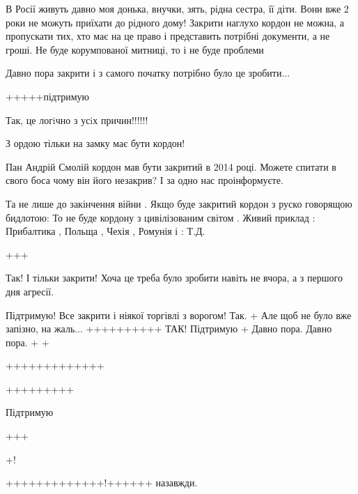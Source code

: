 В Росії живуть давно моя донька, внучки, зять, рідна сестра, її діти. Вони вже
2 роки не можуть приїхати до рідного дому! Закрити наглухо кордон не можна, а
пропускати тих, хто має на це право і представить потрібні документи, а не
гроші. Не буде корумпованої митниці, то і не буде проблеми


Давно пора закрити і з самого початку потрібно було це зробити...

+++++підтримую

Так, це логiчно з усiх причин!!!!!!

З ордою тільки на замку має бути кордон!


Пан Андрій Смолій кордон мав бути закритий в 2014 році.  Можете спитати в свого
боса чому він його незакрив? І за одно нас проінформуєте.


Та не лише до закінчення війни . Якщо буде закритий кордон з руско говорящою
бидлотою: То не буде кордону з цивілізованим світом . Живий приклад :
Прибалтика , Польща , Чехія , Ромунія і : Т.Д.

+++


Так!  І тільки закрити!  Хоча це треба було зробити навіть не вчора, а з
першого дня агресії.

Підтримую!
Все закрити і ніякої торгівлі з ворогом!
Так. +
Але щоб не було вже запізно, на жаль...
++++++++++
ТАК!
Підтримую
+
Давно пора.
Давно пора.
+
+

+++++++++++++

+++++++++

Підтримую

+++

+!

+++++++++++++!++++++ назавжди.
